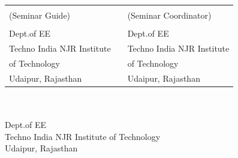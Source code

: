 	
	\begin{singlespace}
		\vspace*{2cm}
		\begin{table}[h!]
			\centering
			\begin{tabular}{p{7cm} p{1.5cm} p{7cm}} 
				\textbf{\guide} && \textbf{\semcordinatorA} \\
				(Seminar Guide) &&  (Seminar Coordinator)\\
				\guidedes & & \semcordinatorAdes\\ 
				Dept.of EE && Dept.of EE\\ 
				Techno India NJR Institute & &Techno India NJR Institute\\
				of Technology &&of Technology\\
				Udaipur, Rajasthan && Udaipur, Rajasthan\\
			\end{tabular}
			
		\end{table}
		
		\vspace*{1.3cm}
		
		\begin{center}
			
			\textbf{\hod} \\ 
			\hoddes\\ 
			Dept.of EE\\ 
			Techno India NJR Institute of Technology\\
			Udaipur, Rajasthan\\
			
		\end{center}
	\end{singlespace}
	
	\thispagestyle{empty}




